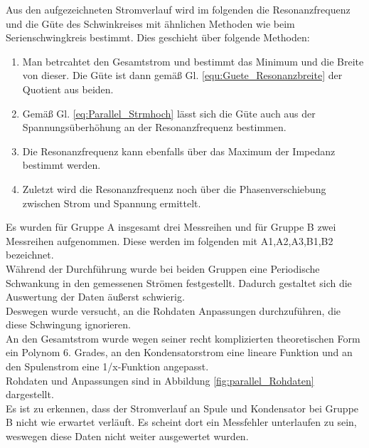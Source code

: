 \documentclass[12pt,a4paper]{article}
\begin{document}
Aus den aufgezeichneten Stromverlauf wird im folgenden die Resonanzfrequenz und die Güte des Schwinkreises mit ähnlichen Methoden wie beim Serienschwingkreis bestimmt. Dies geschieht über folgende Methoden:
\begin{enumerate}
\item Man betrcahtet den Gesamtstrom und bestimmt das Minimum und die Breite von dieser. Die Güte ist dann gemäß Gl. \ref{equ:Guete_Resonanzbreite} der Quotient aus beiden.

\item Gemäß Gl. \ref{eq:Parallel_Strmhoch} lässt sich die Güte auch aus der Spannungsüberhöhung an der Resonanzfrequenz bestimmen.

\item Die Resonanzfrequenz kann ebenfalls über das Maximum der Impedanz bestimmt werden.

\item Zuletzt wird die Resonanzfrequenz noch über die Phasenverschiebung zwischen Strom und Spannung ermittelt.
\end{enumerate}

Es wurden für Gruppe A insgesamt drei Messreihen und für Gruppe B zwei Messreihen aufgenommen. Diese werden im folgenden mit A1,A2,A3,B1,B2 bezeichnet.\\
Während der Durchführung wurde bei beiden Gruppen eine Periodische Schwankung in den gemessenen Strömen festgestellt. Dadurch gestaltet sich die Auswertung der Daten äußerst schwierig.\\
Deswegen wurde versucht, an die Rohdaten Anpassungen durchzuführen, die diese Schwingung ignorieren.\\
An den Gesamtstrom wurde wegen seiner recht komplizierten theoretischen Form ein Polynom 6. Grades, an den Kondensatorstrom eine lineare Funktion und an den Spulenstrom eine 1/x-Funktion angepasst.\\
Rohdaten und Anpassungen sind in Abbildung \ref{fig:parallel_Rohdaten} dargestellt.\\
Es ist zu erkennen, dass der Stromverlauf an Spule und Kondensator bei Gruppe B nicht wie erwartet verläuft. Es scheint dort ein Messfehler unterlaufen zu sein, weswegen diese Daten nicht weiter ausgewertet wurden.
\end{document}
